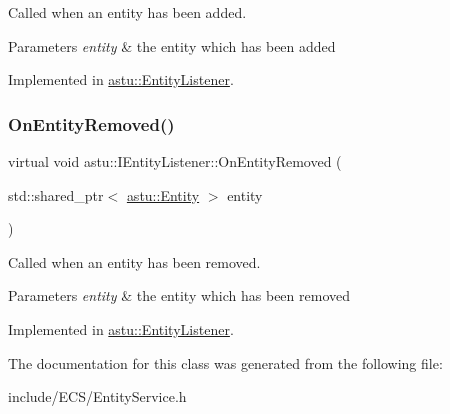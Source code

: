 Called when an entity has been added.


\begin{DoxyParams}{Parameters}
{\em entity} & the entity which has been added \\
\hline
\end{DoxyParams}


Implemented in \hyperlink{classastu_1_1EntityListener_a0c123b57dcabc4c2b6cee8f05db545c8}{astu\+::\+Entity\+Listener}.

\mbox{\label{classastu_1_1IEntityListener_ab3d5a276da5e42cc4831e747fdf11718}} 
\subsubsection{\texorpdfstring{On\+Entity\+Removed()}{OnEntityRemoved()}}
{\footnotesize\ttfamily virtual void astu\+::\+I\+Entity\+Listener\+::\+On\+Entity\+Removed (\begin{DoxyParamCaption}\item[{std\+::shared\+\_\+ptr$<$ \hyperlink{classastu_1_1Entity}{astu\+::\+Entity} $>$}]{entity }\end{DoxyParamCaption})\hspace{0.3cm}{\ttfamily [pure virtual]}}

Called when an entity has been removed.


\begin{DoxyParams}{Parameters}
{\em entity} & the entity which has been removed \\
\hline
\end{DoxyParams}


Implemented in \hyperlink{classastu_1_1EntityListener_ae380d941fafd6933a9f290ac50e7f32b}{astu\+::\+Entity\+Listener}.



The documentation for this class was generated from the following file\+:\begin{DoxyCompactItemize}
\item 
include/\+E\+C\+S/Entity\+Service.\+h\end{DoxyCompactItemize}
